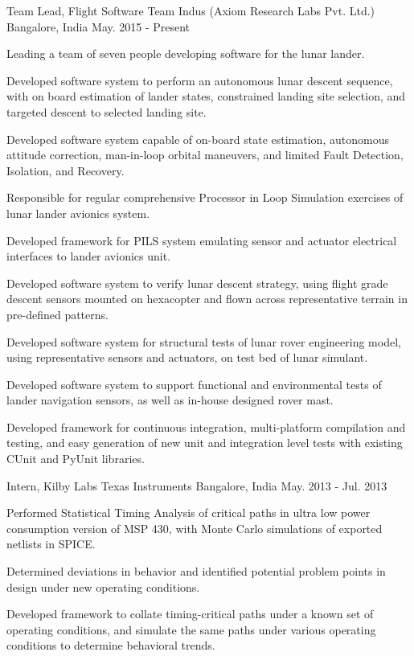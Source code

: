\begin{cventries}
	\cventry
	{Team Lead, Flight Software}
	{Team Indus (Axiom Research Labs Pvt. Ltd.)}
	{Bangalore, India}
	{May. 2015 - Present}
	{
		\begin{cvitems}
			\item{Leading a team of seven people developing software for the lunar lander.}
			\item{Developed software system to perform an autonomous lunar descent sequence, with on board estimation of lander states, constrained landing site selection, and targeted descent to selected landing site.}
			\item{Developed software system capable of on-board state estimation, autonomous attitude correction, man-in-loop orbital maneuvers, and limited Fault Detection, Isolation, and Recovery.}
			\item{Responsible for regular comprehensive Processor in Loop Simulation exercises of lunar lander avionics system.}
			\item{Developed framework for PILS system emulating sensor and actuator electrical interfaces to lander avionics unit.}
			\item{Developed software system to verify lunar descent strategy, using flight grade descent sensors mounted on hexacopter and flown across representative terrain in pre-defined patterns.}
			\item{Developed software system for structural tests of lunar rover engineering model, using representative sensors and actuators, on test bed of lunar simulant.}
			\item{Developed software system to support functional and environmental tests of lander navigation sensors, as well as in-house designed rover mast.}
			\item{Developed framework for continuous integration, multi-platform compilation and testing, and easy generation of new unit and integration level tests with existing CUnit and PyUnit libraries.}
		\end{cvitems}
	}

	\cventry
	{Intern, Kilby Labs}
	{Texas Instruments}
	{Bangalore, India}
	{May. 2013 - Jul. 2013}
	{
		\begin{cvitems}
		\item{Performed Statistical Timing Analysis of critical paths in ultra low power consumption version of MSP 430, with Monte Carlo simulations of exported netlists in SPICE.}
		\item{Determined deviations in behavior and identified potential problem points in design under new operating conditions.}
		\item{Developed framework to collate timing-critical paths under a known set of operating conditions, and simulate the same paths under various operating conditions to determine behavioral trends.}
		\end{cvitems}
	}


\end{cventries}

